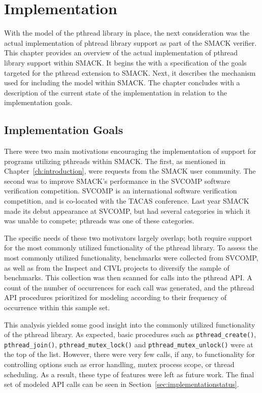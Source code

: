 \chapter{Implementation}\label{ch:implementation}
With the model of the pthread library in place, the next consideration
was the actual implementation of phtread library support as part of
the SMACK verifier.  This chapter provides an overview of the actual
implementation of pthread library support within SMACK.  It begins the
with a specification of the goals targeted for the pthread extension
to SMACK.  Next, it describes the mechanism used for including 
the model within SMACK.  \iffalse [This is followed by a discussion of
changes required in the SMACK tool itself to support the new
model.]\fi  The chapter concludes with a description of the current
state of the implementation in relation to the implementation goals.

\section{Implementation Goals}\label{sec:implementationgoals}
There were two main motivations encouraging the implementation of
support for programs utilizing pthreads within SMACK.  The first, as
mentioned in Chapter~\ref{ch:introduction}, were requests from the
SMACK user community.  The second was to improve SMACK's performance
in the SVCOMP software verification competition. SVCOMP is an
international software verification competition, and is co-located
with the TACAS conference.  Last year SMACK made its debut appearance
at SVCOMP, but had several categories in which it was unable to
compete; pthreads was one of these categories.  

The specific needs of these two motivators largely overlap; both
require support for the most commonly utilized functionality of the
pthread library.  To assess the most commonly utilized functionality,
benchmarks were collected from SVCOMP, as well as from the Inspect and
CIVL projects to diversify the sample of benchmarks.  This collection
was then scanned for calls into the pthread API.  A count of the
number of occurrences for each call was generated, and the pthread API
procedures prioritized for modeling according to their frequency of
occurrence within this sample set. 

This analysis yielded some good insight into the commonly utilized
functionality of the pthread library.  As expected, basic
procedures such as \lstinline[breaklines]|pthread_create()|,
\lstinline[breaklines]|pthread_join()|,
\lstinline[breaklines]|pthread_mutex_lock()| and 
\lstinline[breaklines]|pthread_mutex_unlock()| were at the top of the
list. However, there were very few calls, if any, to functionality for
controlling options such as error handling, mutex process scope, or
thread scheduling. As a result, these type of features were left as
future work. The final set of modeled API calls can be seen in
Section~\ref{sec:implementationstatus}.  

